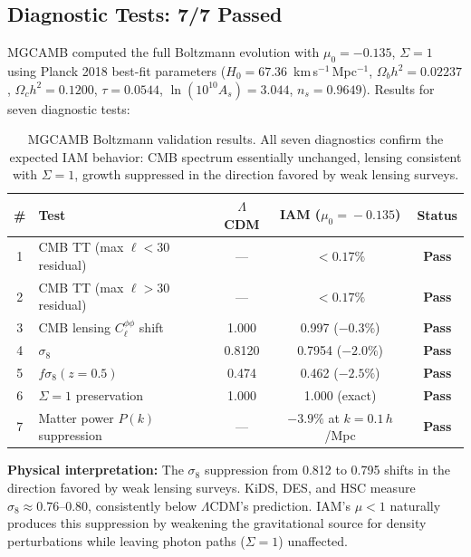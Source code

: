 \documentclass[11pt,letterpaper]{article}
\begin{document}
\subsection{Diagnostic Tests: 7/7 Passed}

MGCAMB computed the full Boltzmann evolution with $\mu_0 = -0.135$, $\Sigma = 1$ using Planck 2018 best-fit parameters ($H_0 = 67.36$~km\,s$^{-1}$\,Mpc$^{-1}$, $\Omega_b h^2 = 0.02237$, $\Omega_c h^2 = 0.1200$, $\tau = 0.0544$, $\ln(10^{10}A_s) = 3.044$, $n_s = 0.9649$). Results for seven diagnostic tests:

\begin{table}[h]
\centering
\begin{tabular}{clccc}
\toprule
\# & Test & $\Lambda$CDM & IAM ($\mu_0\!=\!-0.135$) & Status \\
\midrule
1 & CMB TT (max $\ell < 30$ residual) & --- & $< 0.17\%$ & \textbf{Pass} \\
2 & CMB TT (max $\ell > 30$ residual) & --- & $< 0.17\%$ & \textbf{Pass} \\
3 & CMB lensing $C_\ell^{\phi\phi}$ shift & 1.000 & 0.997 ($-0.3\%$) & \textbf{Pass} \\
4 & $\sigma_8$ & 0.8120 & 0.7954 ($-2.0\%$) & \textbf{Pass} \\
5 & $f\sigma_8(z\!=\!0.5)$ & 0.474 & 0.462 ($-2.5\%$) & \textbf{Pass} \\
6 & $\Sigma = 1$ preservation & 1.000 & 1.000 (exact) & \textbf{Pass} \\
7 & Matter power $P(k)$ suppression & --- & $-3.9\%$ at $k = 0.1\,h$/Mpc & \textbf{Pass} \\
\bottomrule
\end{tabular}
\caption{MGCAMB Boltzmann validation results. All seven diagnostics confirm the expected IAM behavior: CMB spectrum essentially unchanged, lensing consistent with $\Sigma = 1$, growth suppressed in the direction favored by weak lensing surveys.}
\label{tab:mgcamb_results}
\end{table}

\noindent\textbf{Physical interpretation:} The $\sigma_8$ suppression from 0.812 to 0.795 shifts in the direction favored by weak lensing surveys. KiDS, DES, and HSC measure $\sigma_8 \approx 0.76$--$0.80$, consistently below $\Lambda$CDM's prediction. IAM's $\mu < 1$ naturally produces this suppression by weakening the gravitational source for density perturbations while leaving photon paths ($\Sigma = 1$) unaffected.

\end{document}
